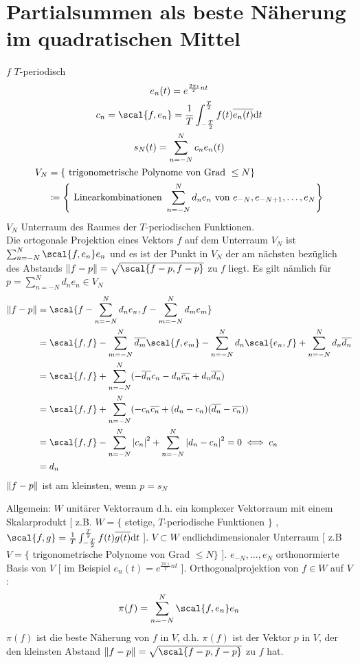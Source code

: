 \section{Partialsummen als beste Näherung im quadratischen Mittel}
$f$ $T$-periodisch \\
\begin{gather*}
	e_n(t) = e^{\frac{2\pi\imath}{T} nt} \\
	c_n = \scal{ f , e_n } = \frac{1}{T} \int_{-\frac{T}{2}}^{\frac{T}{2}} f(t) \overline{e_n(t)} \dd t \\
	s_N(t) = \sum_{n = -N}^N c_n e_n(t) \\
	\begin{split}
		V_N	&= \{ \text{ trigonometrische Polynome von Grad } \leq N \} \\
			&\coloneqq \left\{ \text{ Linearkombinationen } \sum_{n = -N}^N d_n e_n \text{ von } e_{-N} , e_{-N+1} , \dotsc , e_N \right\}
	\end{split}
\end{gather*}
$V_N$ Unterraum des Raumes der $T$-periodischen Funktionen. \\
Die ortogonale Projektion eines Vektors $f$ auf dem Unterraum $V_N$ ist $\sum_{n = -N}^N \scal{f,e_n} e_n$ und es ist der Punkt in $V_N$ der am nächsten bezüglich des Abstands $\norm{f-p} = \sqrt{\scal{f-p,f-p}}$ zu $f$ liegt. Es gilt nämlich für $p = \sum_{n = -N}^N d_n e_n \in V_N$
\begin{gather*}
	\begin{split}
		\norm{f-p}	&= \scal{f - \sum_{n = -N}^N d_n e_n , f - \sum_{m = -N}^N d_m e_m} \\
				&= \scal{f,f} - \sum_{m = -N}^N \overline{d_m} \scal{f,e_m} - \sum_{n = -N}^N d_n \scal{e_n,f} + \sum_{n = -N}^N d_n \overline{d_n} \\
				&= \scal{f,f} + \sum_{n = -N}^N ( - \overline{d_n} c_n - d_n \overline{c_n} + d_n \overline{d_n} ) \\
				&= \scal{f,f} + \sum_{n = -N}^N ( -c_n \overline{c_n} + (d_n - c_n)(\overline{d_n} - \overline{c_n})) \\
				&= \scal{f,f} - \sum_{n = -N}^N \abs{c_n}^2 + \sum_{n = -N}^N \abs{d_n - c_n}^2 = 0 \iff c_n \\
				&= d_n
	\end{split}
\end{gather*}
$\norm{f-p}$ ist am kleinsten, wenn $p = s_N$

Allgemein: $W$ unitärer Vektorraum d.h. ein komplexer Vektorraum mit einem Skalarprodukt [ z.B. $W = \{$ stetige, $T$-periodische Funktionen $\}$ , $\scal{f,g} = \frac{1}{T} \int_{-\frac{T}{2}}^{\frac{T}{2}} f(t) \overline{g(t)} \dd t$ ]. $V \subset W$ endlichdimensionaler Unterraum [ z.B $V = \{$ trigonometrische Polynome von Grad $\leq N \}$ ]. $e_{-N} , \dotsc , e_N$ orthonormierte Basis von $V$ [ im Beispiel $e_n(t) = e^{\frac{2\pi\imath}{T} nt}$ ]. Orthogonalprojektion von $f \in W$ auf $V$:
\[ \pi(f) = \sum_{n = -N}^N \scal{f,e_n} e_n \]
$\pi(f)$ ist die beste Näherung von $f$ in $V$, d.h. $\pi(f)$ ist der Vektor $p$ in $V$, der den kleinsten Abstand $\norm{f-p} = \sqrt{\scal{f-p,f-p}}$ zu $f$ hat.


